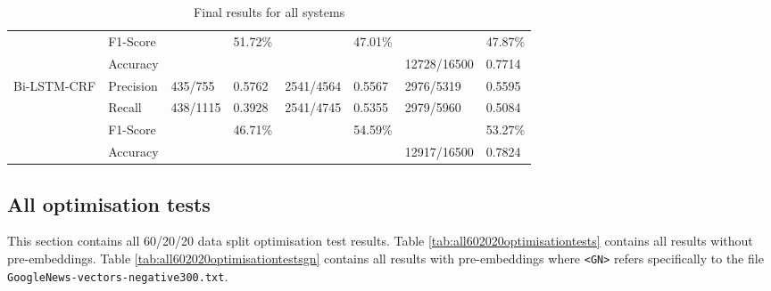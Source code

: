 \begin{table}[H]
\begin{tabular}{|l|lllllll|}
                                    & F1-Score  &          & 51.72\% &           & 47.01\% &             & 47.87\%\\
                                    & Accuracy  &          &         &           &         & 12728/16500 & 0.7714 \\
    \hline
    \multirow{4}{*}{Bi-LSTM-CRF}    & Precision & 435/755  & 0.5762  & 2541/4564 & 0.5567  & 2976/5319   & 0.5595 \\
                                    & Recall    & 438/1115 & 0.3928  & 2541/4745 & 0.5355  & 2979/5960   & 0.5084 \\
                                    & F1-Score  &          & 46.71\% &           & 54.59\% &             & 53.27\%\\
                                    & Accuracy  &          &         &           &         & 12917/16500 & 0.7824 \\
    \hline
  \end{tabular}
  \caption{Final results for all systems}
  \label{tab:allsystemsfinalresults}
\end{table}

\subsection{All optimisation tests}

This section contains all 60/20/20 data split optimisation test results. Table \ref{tab:all602020optimisationtests} contains all results without pre-embeddings. Table \ref{tab:all602020optimisationtestsgn} contains all results with pre-embeddings where \texttt{<GN>} refers specifically to the file \texttt{GoogleNews-vectors-negative300.txt}.

